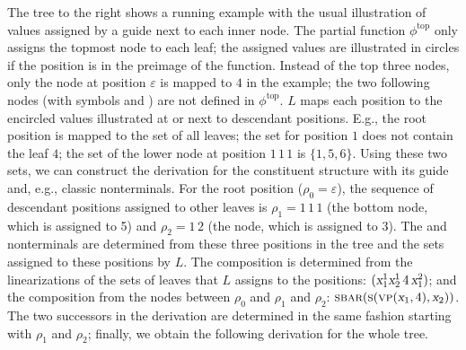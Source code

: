 \documentclass[../../document.tex]{subfiles}
\begin{document}
    \begin{wrapfigure}[8]{r}{0pt}
        
    \end{wrapfigure}
    \parexample
    The tree to the right shows a running example with the usual illustration of values assigned by a guide next to each inner node.
    The partial function \(\phi^{\text{top}}\) only assigns the topmost node to each leaf; the assigned values are illustrated in circles if the position is in the preimage of the function.
    Instead of the top three nodes, only the  node at position \(\varepsilon\) is mapped to \(4\) in the example; the two following nodes (with symbols  and ) are not defined in \(\phi^{\text{top}}\).
    \(L\) maps each position to the encircled values illustrated at or next to descendant positions.
    E.g., the root position is mapped to the set of all leaves;
      the set for position \(1\) does not contain the leaf $4$;
      the set of the lower  node at position \(1\,1\,1\) is \(\{1,5,6\}\).
    Using these two sets, we can construct the derivation for the constituent structure with its guide and, e.g., classic nonterminals.
    For the root position (\(\rho_0 = \varepsilon\)), the sequence of descendant positions assigned to other leaves is \(\rho_1 = 1\,1\,1\) (the bottom  node, which is assigned to 5) and \(\rho_2 = 1\,2\) (the  node, which is assigned to 3).
    The  and  nonterminals are determined from these three positions in the tree and the sets assigned to these positions by \(L\).
    The  composition is determined from the linearizations of the sets of leaves that \(L\) assigns to the positions: \((\textsl{x}_1^1\textsl{x}_2^1\,4\,\textsl{x}_1^2)\); and the  composition from the nodes between \(\rho_0\) and \(\rho_1\) and \(\rho_2\): \(\textsc{sbar}(\textsc{s}(\textsc{vp}(\textsl{x}_1, 4), \textsl{x}_2))\).
    The two successors in the derivation are determined in the same fashion starting with \(\rho_1\) and \(\rho_2\); finally, we obtain the following derivation for the whole tree.
    \begin{center}
        
    \end{center}
\end{document}
